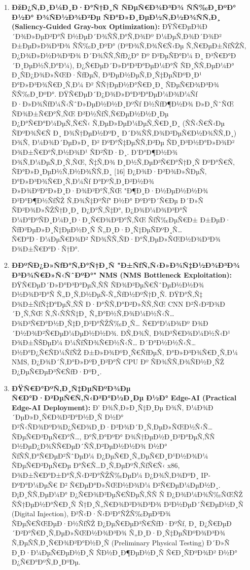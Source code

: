 \documentclass[]{article}
\begin{document}
\begin{enumerate}
\def\labelenumi{\arabic{enumi}.}
\item
  \textbf{ÐžÐ¿Ñ‚Ð¸Ð¼Ð¸Ð·Ð°Ñ†Ð¸Ñ ÑÐµÑ€Ð¾Ð³Ð¾ ÑÑ‰Ð¸ÐºÐ° Ð½Ð° Ð¾ÑÐ½Ð¾Ð²Ðµ ÑÐ°Ð»Ð¸ÐµÐ½Ñ‚Ð½Ð¾ÑÑ‚Ð¸ (Saliency-Guided Gray-box Optimization):} ÐŸÑ€ÐµÐ¾Ð´Ð¾Ð»ÐµÐ²Ð°Ñ Ð½ÐµÐ´Ð¾ÑÑ‚Ð°Ñ‚Ð¾Ðº Ð¼ÐµÑ‚Ð¾Ð´Ð¾Ð² Ð±ÐµÐ»Ð¾Ð³Ð¾ ÑÑ‰Ð¸ÐºÐ° (ÐºÐ¾Ñ‚Ð¾Ñ€Ñ‹Ðµ Ñ‚Ñ€ÐµÐ±ÑƒÑŽÑ‚ Ð¿Ð¾Ð»Ð½Ð¾Ð³Ð¾ Ð´Ð¾ÑÑ‚ÑƒÐ¿Ð° Ðº Ð²ÐµÑÐ°Ð¼ Ð¸ Ð³Ñ€Ð°Ð´Ð¸ÐµÐ½Ñ‚Ð°Ð¼), Ð¿Ñ€ÐµÐ´Ð»Ð°Ð³Ð°ÐµÐ¼Ð°Ñ ÑÐ¸ÑÑ‚ÐµÐ¼Ð° Ð¸ÑÐ¿Ð¾Ð»ÑŒÐ·ÑƒÐµÑ‚ Ð³ÐµÐ½ÐµÑ‚Ð¸Ñ‡ÐµÑÐºÐ¸Ð¹ Ð°Ð»Ð³Ð¾Ñ€Ð¸Ñ‚Ð¼ Ð² ÑÑ†ÐµÐ½Ð°Ñ€Ð¸Ð¸ ÑÐµÑ€Ð¾Ð³Ð¾ ÑÑ‰Ð¸ÐºÐ°. ÐŸÑ€ÐµÐ´Ð¿Ð¾Ð»Ð°Ð³Ð°ÐµÐ¼Ð¾Ð¼Ñƒ Ð·Ð»Ð¾ÑƒÐ¼Ñ‹ÑˆÐ»ÐµÐ½Ð½Ð¸ÐºÑƒ Ð½ÑƒÐ¶Ð½Ð¾ Ð»Ð¸ÑˆÑŒ ÑÐ¾Ð±Ñ€Ð°Ñ‚ÑŒ Ð²Ð½ÑƒÑ‚Ñ€ÐµÐ½Ð½Ð¸Ðµ Ð¿Ð°Ñ€Ð°Ð¼ÐµÑ‚Ñ€Ñ‹ Ñ‚ÐµÐ»ÐµÐ¼ÐµÑ‚Ñ€Ð¸Ð¸ (ÑÑ‹Ñ€Ñ‹Ðµ ÑÐºÐ¾Ñ€Ñ Ð¸ Ð¾Ñ†ÐµÐ½ÐºÐ¸ Ð´Ð¾ÑÑ‚Ð¾Ð²ÐµÑ€Ð½Ð¾ÑÑ‚Ð¸) Ð¾Ñ‚ Ð¼Ð¾Ð´ÐµÐ»Ð¸ Ð² ÐºÐ°Ñ‡ÐµÑÑ‚Ð²Ðµ ÑÐ¸Ð³Ð½Ð°Ð»Ð¾Ð² Ð¾Ð±Ñ€Ð°Ñ‚Ð½Ð¾Ð¹ ÑÐ²ÑÐ·Ð¸. Ð’Ð°Ð¶Ð½Ð¾ Ð¾Ñ‚Ð¼ÐµÑ‚Ð¸Ñ‚ÑŒ, Ñ‡Ñ‚Ð¾ Ð¸Ð½Ñ‚ÐµÐ³Ñ€Ð°Ñ†Ð¸Ñ ÐºÐ°Ñ€Ñ‚ ÑÐ°Ð»Ð¸ÐµÐ½Ñ‚Ð½Ð¾ÑÑ‚Ð¸ {[}16{]} Ð¿Ð¾Ð·Ð²Ð¾Ð»ÑÐµÑ‚ Ð°Ð»Ð³Ð¾Ñ€Ð¸Ñ‚Ð¼Ñƒ Ð°ÐºÑ‚Ð¸Ð²Ð½Ð¾ Ð»Ð¾ÐºÐ°Ð»Ð¸Ð·Ð¾Ð²Ð°Ñ‚ÑŒ "Ð¶Ð¸Ð·Ð½ÐµÐ½Ð½Ð¾ Ð²Ð°Ð¶Ð½ÑƒÑŽ Ñ‚Ð¾Ñ‡ÐºÑƒ" Ð½Ð° ÐºÐ°Ð´Ñ€Ðµ Ð´Ð»Ñ ÑÐ²Ð¾Ð»ÑŽÑ†Ð¸Ð¸ Ð¿Ð°Ñ‚Ñ‡Ð°, Ð¿Ð¾Ð¼Ð¾Ð³Ð°Ñ Ð¼Ð°ÐºÑÐ¸Ð¼Ð¸Ð·Ð¸Ñ€Ð¾Ð²Ð°Ñ‚ÑŒ ÑƒÑ‰ÐµÑ€Ð± Ð±ÐµÐ· ÑƒÐ²ÐµÐ»Ð¸Ñ‡ÐµÐ½Ð¸Ñ Ñ„Ð¸Ð·Ð¸Ñ‡ÐµÑÐºÐ¸Ñ… Ñ€Ð°Ð·Ð¼ÐµÑ€Ð¾Ð² ÑÐ¾ÑÑ‚ÑÐ·Ð°Ñ‚ÐµÐ»ÑŒÐ½Ð¾Ð³Ð¾ Ð¾Ð±Ñ€Ð°Ð·Ñ†Ð°.
\item
  \textbf{Ð­ÐºÑÐ¿Ð»ÑƒÐ°Ñ‚Ð°Ñ†Ð¸Ñ "Ð±ÑƒÑ‚Ñ‹Ð»Ð¾Ñ‡Ð½Ð¾Ð³Ð¾ Ð³Ð¾Ñ€Ð»Ñ‹ÑˆÐºÐ°" NMS (NMS Bottleneck Exploitation):} ÐŸÑ€ÐµÐ´Ð»Ð°Ð³Ð°ÐµÑ‚ÑÑ ÑÐ¾Ð²ÐµÑ€ÑˆÐµÐ½Ð½Ð¾ Ð½Ð¾Ð²Ð°Ñ Ñ„Ð¸Ñ‚Ð½ÐµÑ-Ñ„ÑƒÐ½ÐºÑ†Ð¸Ñ. ÐŸÐ°Ñ‚Ñ‡ Ð¾Ð±ÑƒÑ‡Ð°ÐµÑ‚ÑÑ Ð·Ð°ÑÑ‚Ð°Ð²Ð»ÑÑ‚ÑŒ CNN Ð²Ñ‹Ð²Ð¾Ð´Ð¸Ñ‚ÑŒ Ñ‚Ñ‹ÑÑÑ‡Ð¸ Ñ„Ð°Ð½Ñ‚Ð¾Ð¼Ð½Ñ‹Ñ… Ð¾Ð³Ñ€Ð°Ð½Ð¸Ñ‡Ð¸Ð²Ð°ÑŽÑ‰Ð¸Ñ… Ñ€Ð°Ð¼Ð¾Ðº Ð¾Ð´Ð½Ð¾Ð²Ñ€ÐµÐ¼ÐµÐ½Ð½Ð¾. Ð­Ñ‚Ð¾Ñ‚ Ð¾Ð³Ñ€Ð¾Ð¼Ð½Ñ‹Ð¹ Ð¾Ð±ÑŠÐµÐ¼ Ð¼ÑƒÑÐ¾Ñ€Ð½Ñ‹Ñ… Ð´Ð°Ð½Ð½Ñ‹Ñ… Ð½Ð°Ð¿Ñ€ÑÐ¼ÑƒÑŽ Ð±Ð»Ð¾ÐºÐ¸Ñ€ÑƒÐµÑ‚ Ð°Ð»Ð³Ð¾Ñ€Ð¸Ñ‚Ð¼ NMS, Ð¿Ð¾Ð´Ñ‚Ð°Ð»ÐºÐ¸Ð²Ð°Ñ CPU Ðº ÑÐ¾ÑÑ‚Ð¾ÑÐ½Ð¸ÑŽ Ð¿ÐµÑ€ÐµÐ³Ñ€ÑƒÐ·ÐºÐ¸.
\item
  \textbf{ÐŸÑ€Ð°ÐºÑ‚Ð¸Ñ‡ÐµÑÐºÐ¾Ðµ Ñ€Ð°Ð·Ð²ÐµÑ€Ñ‚Ñ‹Ð²Ð°Ð½Ð¸Ðµ Ð½Ð° Edge-AI (Practical Edge-AI Deployment):} Ð’ Ð¾Ñ‚Ð»Ð¸Ñ‡Ð¸Ðµ Ð¾Ñ‚ Ð¼Ð¾Ð´ÐµÐ»Ð¸Ñ€Ð¾Ð²Ð°Ð½Ð¸Ñ Ð½Ð° Ð²Ñ‹ÑÐ¾ÐºÐ¾Ð¿Ñ€Ð¾Ð¸Ð·Ð²Ð¾Ð´Ð¸Ñ‚ÐµÐ»ÑŒÐ½Ñ‹Ñ… ÑÐµÑ€Ð²ÐµÑ€Ð°Ñ…, Ð°Ñ‚Ð°ÐºÐ° Ð¾Ñ†ÐµÐ½Ð¸Ð²Ð°ÐµÑ‚ÑÑ Ð½ÐµÐ¿Ð¾ÑÑ€ÐµÐ´ÑÑ‚Ð²ÐµÐ½Ð½Ð¾ Ð½Ð° ÑƒÑÑ‚Ð°Ñ€ÐµÐ²ÑˆÐµÐ¼ Ð¿ÐµÑ€Ð¸Ñ„ÐµÑ€Ð¸Ð¹Ð½Ð¾Ð¼ ÑÐµÑ€Ð²ÐµÑ€Ðµ Ð°Ñ€Ñ…Ð¸Ñ‚ÐµÐºÑ‚ÑƒÑ€Ñ‹ x86, Ð¾Ð±Ñ€Ð°Ð±Ð°Ñ‚Ñ‹Ð²Ð°ÑŽÑ‰ÐµÐ¼ Ð¿Ð¾Ñ‚Ð¾ÐºÐ¸ IP-ÐºÐ°Ð¼ÐµÑ€ Ð² Ñ€ÐµÐ°Ð»ÑŒÐ½Ð¾Ð¼ Ð²Ñ€ÐµÐ¼ÐµÐ½Ð¸. Ð¡Ð¸ÑÑ‚ÐµÐ¼Ð° Ð¿Ñ€Ð¾Ð²ÐµÑ€ÑÐµÑ‚ÑÑ Ñ Ð¿Ð¾Ð¼Ð¾Ñ‰ÑŒÑŽ ÑÑ†ÐµÐ½Ð°Ñ€Ð¸Ñ Ñ†Ð¸Ñ„Ñ€Ð¾Ð²Ð¾Ð³Ð¾ Ð²Ð½ÐµÐ´Ñ€ÐµÐ½Ð¸Ñ (Digital Injection), Ð²Ñ‹Ð·Ñ‹Ð²Ð°ÑŽÑ‰ÐµÐ³Ð¾ ÑÐµÑ€ÑŒÐµÐ·Ð½ÑƒÑŽ Ð¿ÐµÑ€ÐµÐ³Ñ€ÑƒÐ·ÐºÑƒ, Ð¸ Ð¿Ñ€ÐµÐ´Ð²Ð°Ñ€Ð¸Ñ‚ÐµÐ»ÑŒÐ½Ð¾Ð³Ð¾ Ñ„Ð¸Ð·Ð¸Ñ‡ÐµÑÐºÐ¾Ð³Ð¾ Ñ‚ÐµÑÑ‚Ð¸Ñ€Ð¾Ð²Ð°Ð½Ð¸Ñ (Preliminary Physical Testing) Ð´Ð»Ñ Ð¸Ð·Ð¼ÐµÑ€ÐµÐ½Ð¸Ñ ÑÐ½Ð¸Ð¶ÐµÐ½Ð¸Ñ Ñ€Ð¸ÑÐºÐ¾Ð² Ð½Ð° Ð¿Ñ€Ð°ÐºÑ‚Ð¸ÐºÐµ.
\end{enumerate}
\end{document}
